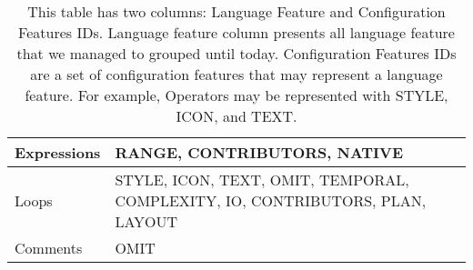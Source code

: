 \begin{table}[H]
\begin{tabular}{|l|p{11cm}|}
Expressions                       & RANGE, CONTRIBUTORS, NATIVE                                                   \\ \hline
Loops                             & STYLE, ICON, TEXT, OMIT, TEMPORAL, COMPLEXITY, IO, CONTRIBUTORS, PLAN, LAYOUT \\ \hline
Comments                          & OMIT                                                                          \\ \hline
\end{tabular}
\caption{This table has two columns: Language Feature and Configuration Features IDs. Language feature column presents all language feature that we managed to grouped until today. Configuration Features IDs are a set of configuration features that may represent a language feature. For example, Operators may be represented with STYLE, ICON, and TEXT.}
\label{tab15}
\end{table}